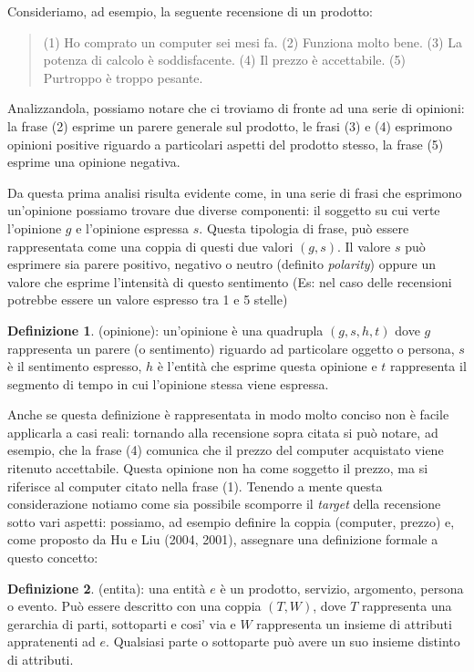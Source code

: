 \documentclass[a4paper,12pt,openright,twoside]{report}
\theoremstyle{definition}
\newtheorem{defi}{Definizione}[section]
\begin{document}
Consideriamo, ad esempio, la seguente recensione di un prodotto:
\begin{quote}
(1) Ho comprato un computer sei mesi fa. (2) Funziona molto bene. (3) La potenza
di calcolo è soddisfacente. (4) Il prezzo è accettabile. (5) Purtroppo è troppo pesante.
\end{quote}
Analizzandola, possiamo notare che ci troviamo di fronte ad una serie di opinioni: la frase (2) esprime un 
parere generale sul prodotto, le frasi (3) e (4) esprimono opinioni positive riguardo
a particolari aspetti del prodotto stesso, la frase (5) esprime una opinione negativa.

Da questa prima analisi risulta evidente come, in una serie di frasi che esprimono un'opinione 
possiamo trovare due diverse componenti:
il soggetto su cui verte l'opinione $g$ e l'opinione espressa $s$.
Questa tipologia di frase, può essere rappresentata come una coppia di questi due valori $(g,s)$.
Il valore $s$ può esprimere sia parere positivo, negativo o neutro (definito \emph{polarity}) oppure un valore che 
esprime l'intensità di questo sentimento (Es: nel caso delle recensioni potrebbe
essere un valore espresso tra 1 e 5 stelle)

\begin{defi}(opinione): un'opinione è una quadrupla $(g, s, h, t)$ dove $g$ rappresenta un parere
(o sentimento) riguardo ad particolare oggetto o persona, $s$ è il sentimento espresso,
$h$ è l'entità che esprime questa opinione e $t$ rappresenta il segmento  di tempo in cui
l'opinione stessa viene espressa.
\end{defi}

Anche se questa definizione è rappresentata in modo molto conciso non è facile applicarla
a casi reali: tornando alla recensione sopra citata si può notare, ad esempio, che
la frase (4) comunica che il prezzo del computer acquistato viene ritenuto 
accettabile. Questa opinione non ha come soggetto il prezzo, ma si riferisce al computer
citato nella frase (1). Tenendo a mente questa considerazione notiamo come
sia possibile scomporre il \emph{target} della recensione sotto vari aspetti: possiamo, ad esempio
definire la coppia (computer, prezzo) e, come proposto da Hu e Liu (2004, 2001), %
assegnare una definizione formale a questo concetto:

\begin{defi}(entita): una entità $e$ è un prodotto, servizio, argomento, persona o evento.
Può essere descritto con una coppia $(T,W)$, dove $T$ rappresenta una gerarchia di parti, sottoparti 
e cosi' via e $W$ rappresenta un insieme di attributi appratenenti ad $e$. Qualsiasi parte o sottoparte può
avere un suo insieme distinto di attributi.
\end{defi}
\end{document}
